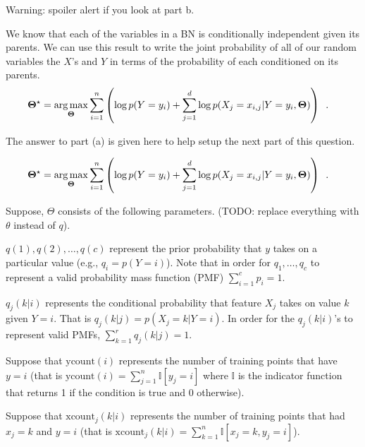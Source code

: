 \documentclass[assignment03_Solutions]{subfiles}
\begin{document}
\begin{exercise}[(60 minutes)]
Warning: spoiler alert if you look at part b.
\begin{boxedsolution}
We know that each of the variables in a BN is conditionally independent given its parents.  We can use this result to write the joint probability of all of our random variables the $X$'s and $Y$ in terms of the probability of each conditioned on its parents.
\begin{align}
\mathbf{\Theta^\star} &= \operatorname*{arg\,max}_{\mathbf{\Theta}} \sum_{i=1}^n  \left ( \log p(Y = y_i)  + \sum_{j=1}^d \log p(X_j = x_{i,j} | Y = y_i,  \mathbf{\Theta}) \right ) \enspace . \label{eq:nbmle}
\end{align}
\end{boxedsolution}

\item The answer to part (a) is given here to help setup the next part of this question.

\begin{align}
\mathbf{\Theta^\star} &= \operatorname*{arg\,max}_{\mathbf{\Theta}} \sum_{i=1}^n  \left ( \log p(Y = y_i)  + \sum_{j=1}^d \log p(X_j = x_{i,j} | Y = y_i,  \mathbf{\Theta}) \right ) \enspace . \label{eq:nbmle}
\end{align}

Suppose, $\Theta$ consists of the following parameters. (TODO: replace everything with $\theta$ instead of $q$).

\bi
\item $q(1), q(2), \ldots, q(c)$ represent the prior probability that $y$ takes on a particular value (e.g., $q_i = p(Y = i)$).  Note that in order for $q_1, \ldots, q_c$ to represent a valid probability mass function (PMF) $\sum_{i=1}^c p_i = 1$.
\item $q_{j}(k | i)$ represents the conditional probability that feature $X_j$ takes on value $k$ given $Y = i$.  That is $q_{j}(k | j) = p(X_j = k | Y = i)$.  In order for the $q_j(k|i)$'s to represent valid PMFs, $\sum_{k=1}^{r} q_{j}(k | j) = 1$.
\ei

Suppose that $\mbox{ycount}(i)$ represents the number of training points that have $y = i$ (that is $\mbox{ycount}(i) = \sum_{j=1}^n \mathbb{I} \left [y_j = i \right]$ where $\mathbb{I}$ is the indicator function that returns 1 if the condition is true and 0 otherwise).

Suppose that $\mbox{xcount}_j(k|i)$ represents the number of training points that had $x_j = k$ and $y = i$ (that is $\mbox{xcount}_j (k|i) = \sum_{k=1}^n \mathbb{I} \left [ x_j = k, y_j = i \right ]$).


\end{exercise}
\end{document}
